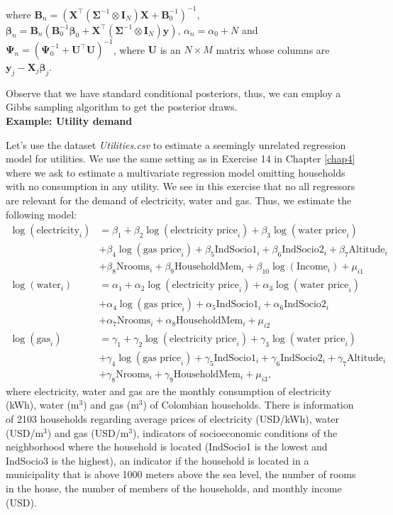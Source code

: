 where $\bm{B}_n=(\bm{X}^{\top}(\bm{\Sigma}^{-1}\otimes \bm{I}_N )\bm{X}+\bm{B}_0^{-1})^{-1}$, $\bm{\beta}_n=\bm{B}_n(\bm{B}_0^{-1}\bm{\beta}_0 + \bm{X}^{\top}(\bm{\Sigma}^{-1}\otimes \bm{I}_N)\bm{y})$, $\alpha_n = \alpha_0 + N$ and $\bm{\Psi}_n = (\bm{\Psi}_0^{-1} + \bm{U}^{\top}\bm{U})^{-1}$, where $\bm{U}$ is an $N\times M$ matrix whose columns are $\bm{y}_j-\bm{X}_j\bm{\beta}_j$.

Observe that we have standard conditional posteriors, thus, we can employ a Gibbs sampling algorithm to get the posterior draws.\\

\textbf{Example: Utility demand}

Let's use the dataset \textit{Utilities.csv} to estimate a seemingly unrelated regression model for utilities. We use the same setting as in Exercise 14 in Chapter \ref{chap4} where we ask to estimate a multivariate regression model omitting households with no consumption in any utility. We see in this exercise that no all regressors are relevant for the demand of electricity, water and gas. Thus, we estimate the following model:
\begin{align*}
	\log(\text{electricity}_i) & = \beta_1 + \beta_2\log(\text{electricity price}_i)+\beta_3\log(\text{water price}_i)\\
	&+\beta_4\log(\text{gas price}_i)+\beta_5\text{IndSocio1}_i+\beta_6\text{IndSocio2}_i+\beta_7\text{Altitude}_i\\
	&+\beta_8\text{Nrooms}_i+\beta_9\text{HouseholdMem}_i+\beta_{10}\log(\text{Income}_i)+\mu_{i1}\\
	\log(\text{water}_i) & = \alpha_1 + \alpha_2\log(\text{electricity price}_i)+\alpha_3\log(\text{water price}_i)\\
	&+\alpha_4\log(\text{gas price}_i)+\alpha_5\text{IndSocio1}_i+\alpha_6\text{IndSocio2}_i\\
	&+\alpha_7\text{Nrooms}_i+\alpha_8\text{HouseholdMem}_i+\mu_{i2}\\
	\log(\text{gas}_i) & = \gamma_1 + \gamma_2\log(\text{electricity price}_i)+\gamma_3\log(\text{water price}_i)\\
	&+\gamma_4\log(\text{gas price}_i)+\gamma_5\text{IndSocio1}_i+\gamma_6\text{IndSocio2}_i+\gamma_7\text{Altitude}_i\\
	&+\gamma_8\text{Nrooms}_i+\gamma_9\text{HouseholdMem}_i+\mu_{i3},
\end{align*} 
where electricity, water and gas are the monthly consumption of electricity (kWh), water (m$^3$) and gas (m$^3$) of Colombian households. There is information of 2103 households regarding average prices of electricity (USD/kWh), water (USD/m$^3$) and gas (USD/m$^3$), indicators of socioeconomic conditions of the neighborhood where the household is located (IndSocio1 is the lowest and IndSocio3 is the highest), an indicator if the household is located in a municipality that is above 1000 meters above the sea level, the number of rooms in the house, the number of members of the households, and monthly income (USD).

